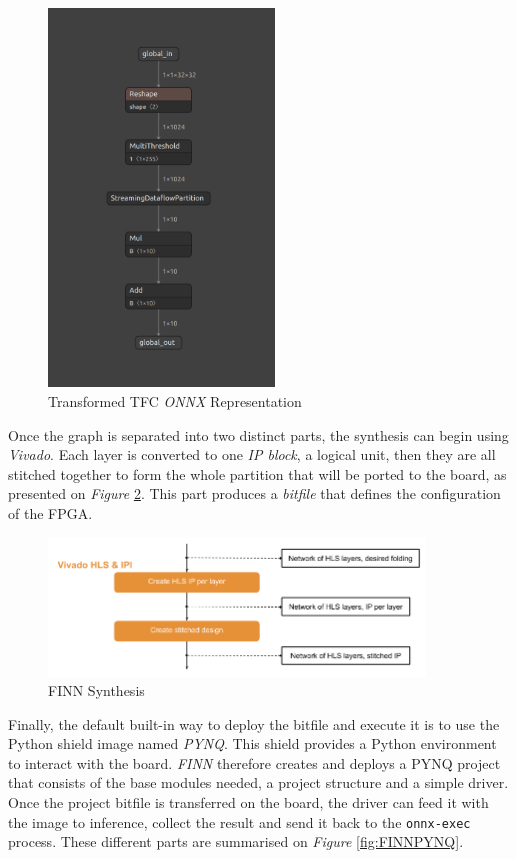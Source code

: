 \newpage

\begin{figure}[htbp]
	\centering
		\includegraphics[width=6cm]{Figures/ONNXEnd.png}
	\caption[Transformed TFC \emph{ONNX} representation]{Transformed TFC \emph{ONNX} Representation}
	\label{fig:ONNXEnd}
\end{figure}

Once the graph is separated into two distinct parts, the synthesis can begin using \emph{Vivado}. Each layer is converted to one \emph{IP block}, a logical unit, then they are all stitched together to form the whole partition that will be ported to the board, as presented on \emph{Figure} \ref{fig:FINNSynthesis}. This part produces a \emph{bitfile} that defines the configuration of the FPGA.

\begin{figure}[htbp]
	\centering
		\includegraphics[width=10cm]{Figures/FINNSynthesis.png}
	\caption[FINN Synthesis]{FINN Synthesis}
	\label{fig:FINNSynthesis}
\end{figure}

Finally, the default built-in way to deploy the bitfile and execute it is to use the Python shield image named \emph{PYNQ}. This shield provides a Python environment to interact with the board. \emph{FINN} therefore creates and deploys a PYNQ project that consists of the base modules needed, a project structure and a simple driver. Once the project bitfile is transferred on the board, the driver can feed it with the image to inference, collect the result and send it back to the \texttt{onnx-exec} process. These different parts are summarised on \emph{Figure} \ref{fig:FINNPYNQ}.

